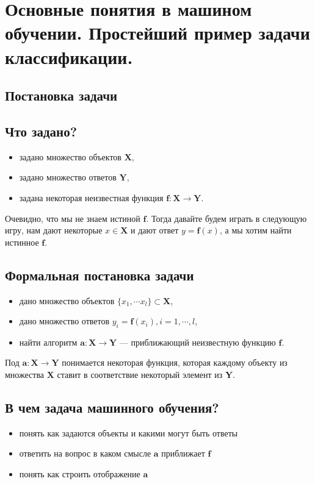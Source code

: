 \section{Основные понятия в машином обучении. Простейший пример задачи классификации.}

\subsection{Постановка задачи}

\subsection{Что задано?}
\begin{itemize}
	\item задано множество объектов $\textbf{X}$,
	\item задано множество ответов $\textbf{Y}$,
	\item задана некоторая неизвестная функция $\textbf{f}: \textbf{X} \rightarrow \textbf{Y}$.
\end{itemize}

Очевидно, что мы не знаем истиной $\textbf{f}$. Тогда давайте будем играть в следующую игру, нам дают некоторые $x \in \textbf{X}$ и дают ответ $y = \textbf{f}(x)$, а мы хотим найти истинное $\textbf{f}$.

\subsection{Формальная постановка задачи}
\begin{itemize}
	\item дано множество объектов $\{x_1, \cdots x_l\} \subset \textbf{X}$,
	\item дано множество ответов $y_i = \textbf{f}(x_i), i=1,\cdots, l$,
	\item найти алгоритм $\textbf{a}:\textbf{X} \rightarrow \textbf{Y}$ --- приближающий неизвестную функцию $\textbf{f}$.
\end{itemize}

Под $\textbf{a}:\textbf{X} \rightarrow \textbf{Y}$ понимается некоторая функция, которая каждому объекту из множества $\textbf{X}$ ставит в соответствие некоторый элемент из \textbf{Y}.

\subsection{В чем задача машинного обучения?}
\begin{itemize}
	\item понять как задаются объекты и какими могут быть ответы
	\item ответить на вопрос в каком смысле $\textbf{a}$ приближает $\textbf{f}$
	\item понять как строить отображение $\textbf{a}$
\end{itemize}

